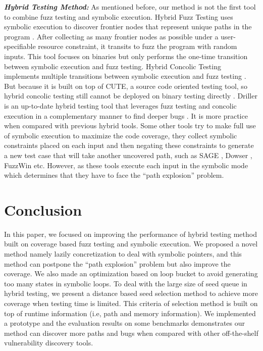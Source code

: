 \documentclass[a4paper]{article}
\begin{document}
\noindent\textit{\textbf{Hybrid Testing Method:}}
As mentioned before, our method is not the first tool to combine fuzz testing and symbolic execution. Hybrid Fuzz Testing uses symbolic execution to discover frontier nodes that represent unique paths in the program \cite{pak2012hybrid}. After collecting as many frontier nodes as possible under a user-specifiable resource constraint, it transits to fuzz the program with random inputs. This tool focuses on binaries but only performs the one-time transition between symbolic execution and fuzz testing. Hybrid Concolic Testing implements multiple transitions between symbolic execution and fuzz testing \cite{majumdar2007hybrid}. But because it is built on top of CUTE, a source code oriented testing tool, so hybrid concolic testing still cannot be deployed on binary testing directly \cite{sen2005cute}. Driller is an up-to-date hybrid testing tool that leverages fuzz testing and concolic execution in a complementary manner to find deeper bugs \cite{stephens2016driller}. It is more practice when compared with previous hybrid tools. Some other tools try to make full use of symbolic execution to maximize the code coverage, they collect symbolic constraints placed on each input and then negating these constraints to generate a new test case that will take another uncovered path, such as SAGE \cite{godefroid2012sage}, Dowser \cite{haller2013dowsing}, FuzzWin \cite{online:fuzzwin} etc. However, as these tools execute each input in the symbolic mode which determines that they have to face the ``path explosion'' problem. 

\section{Conclusion} \label{sec:conclusion}
In this paper, we focused on improving the performance of hybrid testing method built on coverage based fuzz testing and symbolic execution. We proposed a novel method namely lazily concretization to deal with symbolic pointers, and this method can postpone the ``path explosion'' problem but also improve the coverage. We also made an optimization based on loop bucket to avoid generating too many states in symbolic loops. To deal with the large size of seed queue in hybrid testing, we present a distance based seed selection method to achieve more coverage when testing time is limited. This criteria of selection method is built on top of runtime information (i.e, path and memory information). We implemented a prototype and the evaluation results on some benchmarks demonstrates our method can discover more paths and bugs when compared with other off-the-shelf vulnerability discovery tools.



\end{document}
